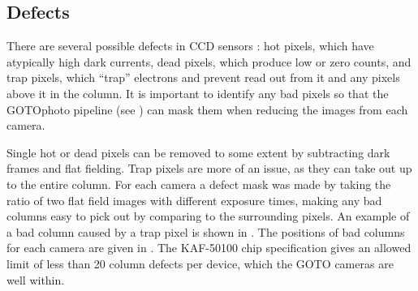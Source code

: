 \subsection{Defects}
\label{sec:defects}
\begin{colsection}

There are several possible defects in CCD sensors \citep{CCDs}: hot pixels, which have atypically high dark currents, dead pixels, which produce low or zero counts, and trap pixels, which ``trap'' electrons and prevent read out from it and any pixels above it in the column. It is important to identify any bad pixels so that the GOTOphoto pipeline (see ) can mask them when reducing the images from each camera.

Single hot or dead pixels can be removed to some extent by subtracting dark frames and flat fielding. Trap pixels are more of an issue, as they can take out up to the entire column. For each camera a defect mask was made by taking the ratio of two flat field images with different exposure times, making any bad columns easy to pick out by comparing to the surrounding pixels. An example of a bad column caused by a trap pixel is shown in . The positions of bad columns for each camera are given in . The KAF-50100 chip specification gives an allowed limit of less than 20 column defects per device, which the GOTO cameras are well within.


\end{colsection}

